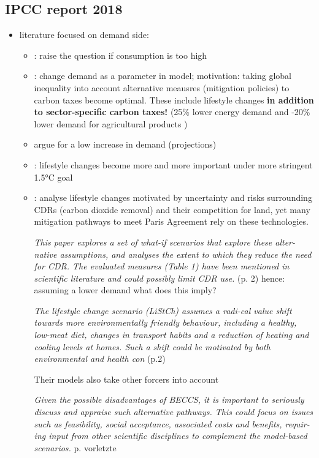 \subsection{IPCC report 2018 \citep{Rogelj2018MitigationDevelopment.}}
\begin{itemize}
\item literature focused on demand side: 
\begin{itemize}
	\item \cite{Arrow2004AreMuch}: raise the question if consumption is too high
	\item 
	\cite{Bertram2018TargetedScenarios}:   change demand as a parameter in  model; motivation: taking global inequality into account alternative meausres (mitigation policies) to carbon taxes  become optimal. These include lifestyle changes \textbf{in addition to sector-specific carbon taxes!} (25\% lower energy demand and -20\% lower demand for agricultural products )
	\item \cite{Grubler2018ATechnologies} argue for a low increase in demand (projections)
	\item \cite{Liu2018SocioeconomicC}: lifestyle changes become more and more important under more stringent 1.5°C goal 
	\item \cite{VanVuuren2018AlternativeTechnologies}: analyse lifestyle changes motivated by uncertainty and risks surrounding CDRs (carbon dioxide removal) and their competition for land, yet many mitigation pathways to meet Paris Agreement rely on these technologies.
	
	\textit{This paper  explores  a  set  of  what-if  scenarios  that  explore  these  alter-native  assumptions,  and  analyses  the  extent  to  which  they  reduce  the  need  for  CDR.  The  evaluated  measures  (Table  1)  have  been  mentioned in scientific literature and could possibly limit CDR use. } (p. 2) \ar hence: assuming a lower demand what does this imply?
	
	\textit{The  lifestyle  change  scenario  (LiStCh)  assumes  a  radi-cal  value  shift  towards  more  environmentally  friendly  behaviour,  including a healthy, low-meat diet, changes in transport habits and a reduction of heating and cooling levels at homes. Such a shift could be motivated by both environmental and health con} (p.2)
	
	Their models also take other forcers into account 
	
	\textit{ Given  the  possible  disadvantages  of  BECCS,  it  is  important  to  seriously  discuss  and  appraise such alternative pathways. This could focus on issues such as feasibility, social acceptance, associated costs and benefits, requir-ing input from other scientific disciplines to complement the model-based  scenarios. } p. vorletzte
	

\end{itemize}
\end{itemize}
